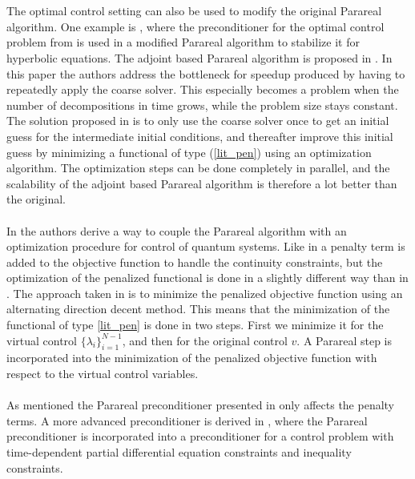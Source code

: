 \\
\\
The optimal control setting can also be used to modify the original Parareal algorithm. One example is \cite{chen2015adjoint}, where the preconditioner for the optimal control problem from \cite{maday2002parareal}  is used in a modified Parareal algorithm to stabilize it for hyperbolic equations. The adjoint based Parareal algorithm is proposed in \cite{rao2014adjoint}. In this paper the authors address the bottleneck for speedup produced by having to repeatedly apply the coarse solver. This especially becomes a problem when the number of decompositions in time grows, while the problem size stays constant. The solution proposed in \cite{rao2014adjoint} is to only use the coarse solver once to get an initial guess for the intermediate initial conditions, and thereafter improve this initial guess by minimizing a functional of type (\ref{lit_pen}) using an optimization algorithm. The optimization steps can be done completely in parallel, and the scalability of the adjoint based Parareal algorithm is therefore a lot better than the original.
\\
\\
In \cite{maday2003parallel,maday2007monotonic} the authors derive a way to couple the Parareal algorithm with an optimization procedure for control of quantum systems. Like in  \cite{maday2002parareal} a penalty term is added to the objective function to handle the continuity constraints, but the optimization of the penalized functional is done in a slightly different way than in \cite{maday2002parareal}. The approach taken in \cite{maday2007monotonic} is to minimize the penalized objective function using an alternating direction decent method. This means that the minimization of the functional of type \ref{lit_pen} is done in two steps. First we minimize it for the virtual control $\{\lambda_i\}_{i=1}^{N-1}$, and then for the original control $v$. A Parareal step is incorporated into the minimization of the penalized objective function with respect to the virtual control variables.
\\
\\
As mentioned the Parareal preconditioner presented in \cite{maday2002parareal} only affects the penalty terms. A more advanced preconditioner is derived in \cite{ulbrich2015preconditioners}, where the Parareal preconditioner is incorporated into a preconditioner for a control problem with time-dependent partial differential equation constraints and inequality constraints.
